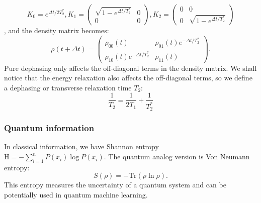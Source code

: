 \begin{equation}
    K_0 = e^{\Delta t/2T_2^\ast}, 
    K_1 = \begin{pmatrix}
\sqrt{1 - e^{{\Delta t/T_2^\ast}}} & 0 \\
0 & 0
\end{pmatrix},
K_2 = \begin{pmatrix}
0 & 0 \\
0 & \sqrt{1 - e^{\Delta t/T_2^\ast}}
\end{pmatrix}
\end{equation}
, and the density matrix becomes:
\begin{equation}
    \rho(t+\Delta t) = \begin{pmatrix}
\rho_{00}(t)& \rho_{01}(t)e^{-\Delta t/T_2^\ast} \\
\rho_{10}(t)e^{-\Delta t/T_2^\ast}
& \rho_{11}(t)
\end{pmatrix}.
\end{equation}
Pure dephasing only affects the off-diagonal terms in the density matrix. We shall notice that the energy relaxation also affects the off-diagonal terms, so we define a dephasing or transverse relaxation time $T_2$:
\begin{equation}
    \frac{1}{T_2} = \frac{1}{2T_1} + \frac{1}{T_2^\ast}
\end{equation}

\subsubsection{Quantum information}
In classical information, we have Shannon entropy $\text{H} = -\sum_{i=1}^n P(x_i)\log P(x_i)$. The quantum analog version is Von Neumann entropy: \begin{equation}
    S(\rho) = -\text{Tr}(\rho\ln\rho).
\end{equation}
This entropy measures the uncertainty of a quantum system and can be potentially used in quantum machine learning\cite{RN57}. 

